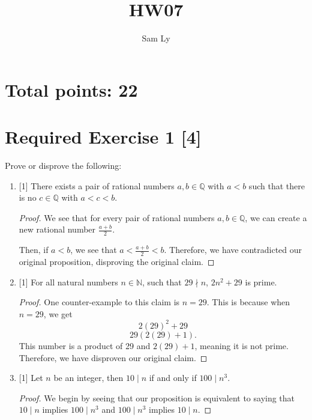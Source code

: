 \documentclass{article}
\title{HW07}
\author{Sam Ly}
\begin{document}
\maketitle

\section*{Total points: 22}

\section*{Required Exercise 1 [4]}

Prove or disprove the following:

\begin{enumerate}
    \item {
        [1] There exists a pair of rational numbers \(a, b \in \mathbb{Q}\) with 
        \(a < b\) such that there is no \(c \in \mathbb{Q}\) with \(a < c < b\).

        \begin{proof}
            We see that for every pair of rational numbers \(a, b \in \mathbb{Q}\), 
            we can create a new rational number \(\frac{a+b}{2}\).

            Then, if \(a < b\), we see that \(a < \frac{a + b }{2} < b\). 
            Therefore, we have contradicted our original proposition, disproving the 
            original claim.
        \end{proof}

    }

    \item {
        [1] For all natural numbers \(n \in \mathbb{N}\), such that \(29 \nmid n\),
        \(2n^2 + 29\) is prime.

        \begin{proof}
            One counter-example to this claim is \(n = 29\). This is because when
            \(n = 29\), we get 
            \[2(29)^2 + 29\]
            \[29(2(29) + 1).\]
            This number is a product of 29 and \(2(29) + 1\), meaning it is not prime. 
            Therefore, we have disproven our original claim.
        \end{proof}
    }

    \item {
        [1] Let \(n\) be an integer, then \(10 \mid n\) if and only if \(100 \mid n^3\).

        \begin{proof}
            We begin by seeing that our proposition is equivalent to saying that 
            \(10 \mid n\) implies \(100 \mid n^3\) and \(100 \mid n^3\) implies \(10 \mid n\). 


\end{proof}}
\end{enumerate}
\end{document}
